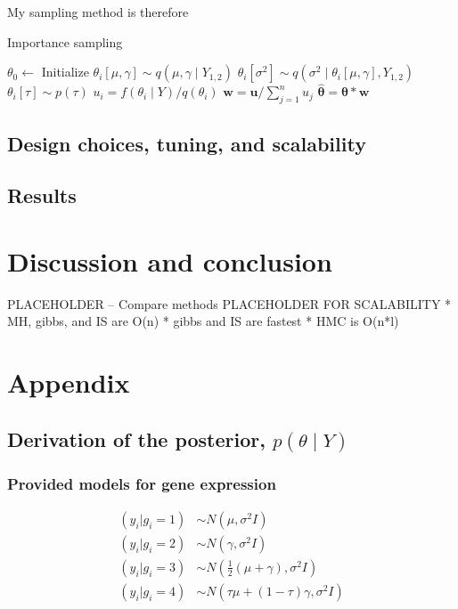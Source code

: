 \documentclass{article}
\begin{document}
My sampling method is therefore
\begin{algorithm}
\caption{Importance sampling}
  \begin{algorithmic}
    \State $\theta_0 \longleftarrow$  Initialize
      \State $\theta_i[\mu, \gamma] \sim q(\mu, \gamma \mid Y_{1,2})$
      \State $\theta_i[\sigma^2] \sim q(\sigma^2 \mid \theta_i[\mu, \gamma], Y_{1,2})$
      \State $\theta_i[\tau] \sim p(\tau)$
      \State $u_i = f(\theta_i \mid Y) / q(\theta_i)$  
    \EndFor
    \State $\textbf{w} = \textbf{u} / \sum_{j=1}^n u_j$ 
    \State $\hat{\boldsymbol{\theta}} = \boldsymbol{\theta}*\textbf{w}$  
  \end{algorithmic}
\end{algorithm}
\subsection*{Design choices, tuning, and scalability}
\subsection*{Results}

\section{Discussion and conclusion}
PLACEHOLDER -- Compare methods
PLACEHOLDER FOR SCALABILITY
* MH, gibbs, and IS are O(n) 
* gibbs and IS are fastest
* HMC is O(n*l)



{\small


}

\section{Appendix}
\subsection{Derivation of the posterior, $p(\theta \mid Y)$}
\subsubsection{Provided models for gene expression}
\begin{align*}
  (y_i | g_i = 1) &\sim N(\mu, \sigma^2 I)\\
  (y_i | g_i = 2) &\sim N(\gamma, \sigma^2 I)\\
  (y_i | g_i = 3) &\sim N(\frac{1}{2}(\mu + \gamma), \sigma^2 I)\\
  (y_i | g_i = 4) &\sim N(\tau\mu + (1-\tau)\gamma, \sigma^2 I)
\end{align*}
\end{document}
